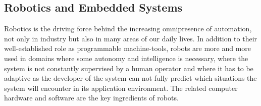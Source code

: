 %
\subsection{Robotics and Embedded Systems} %
Robotics is the driving force behind the increasing omnipresence
of automation, not only in industry but also in many areas of our
daily lives. In addition to their well-established role as
programmable machine-tools, robots are more and more used in
domains where some autonomy and intelligence is necessary, where
the system is not constantly supervised by a human operator and
where it has to be adaptive as the developer of the system can not
fully predict which situations the system will encounter in its
application environment. The related computer hardware and
software are the key ingredients of robots.

